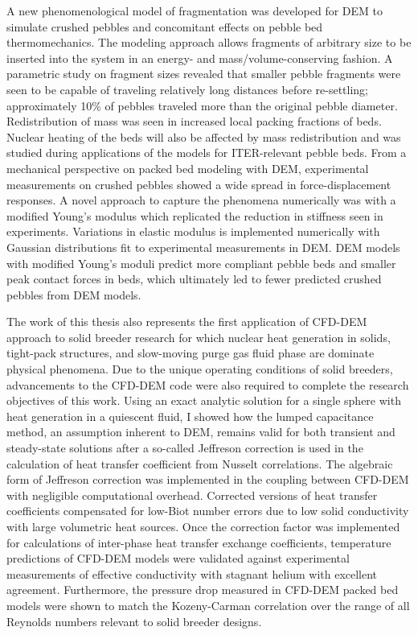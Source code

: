 A new phenomenological model of fragmentation was developed for DEM to simulate crushed pebbles and concomitant effects on pebble bed thermomechanics. The modeling approach allows fragments of arbitrary size to be inserted into the system in an energy- and mass/volume-conserving fashion. A parametric study on fragment sizes revealed that smaller pebble fragments were seen to be capable of traveling relatively long distances before re-settling; approximately 10\% of pebbles traveled more than the original pebble diameter. Redistribution of mass was seen in increased local packing fractions of beds. Nuclear heating of the beds will also be affected by mass redistribution and was studied during applications of the models for ITER-relevant pebble beds. From a mechanical perspective on packed bed modeling with DEM, experimental measurements on crushed pebbles showed a wide spread in force-displacement responses. A novel approach to capture the phenomena numerically was with a modified Young's modulus which replicated the reduction in stiffness seen in experiments. Variations in elastic modulus is implemented numerically with Gaussian distributions fit to experimental measurements in DEM. DEM models with modified Young's moduli predict more compliant pebble beds and smaller peak contact forces in beds, which ultimately led to fewer predicted crushed pebbles from DEM models.

The work of this thesis also represents the first application of CFD-DEM approach to solid breeder research for which nuclear heat generation in solids, tight-pack structures, and slow-moving purge gas fluid phase are dominate physical phenomena. Due to the unique operating conditions of solid breeders, advancements to the CFD-DEM code were also required to complete the research objectives of this work. Using an exact analytic solution for a single sphere with heat generation in a quiescent fluid, I showed how the lumped capacitance method, an assumption inherent to DEM, remains valid for both transient and steady-state solutions after a so-called Jeffreson correction is used in the calculation of heat transfer coefficient from Nusselt correlations. The algebraic form of Jeffreson correction was implemented in the coupling between CFD-DEM with negligible computational overhead. Corrected versions of heat transfer coefficients compensated for low-Biot number errors due to low solid conductivity with large volumetric heat sources. Once the correction factor was implemented for calculations of inter-phase heat transfer exchange coefficients, temperature predictions of CFD-DEM models were validated against experimental measurements of effective conductivity with stagnant helium with excellent agreement. Furthermore, the pressure drop measured in CFD-DEM packed bed models were shown to match the Kozeny-Carman correlation over the range of all Reynolds numbers relevant to solid breeder designs.

